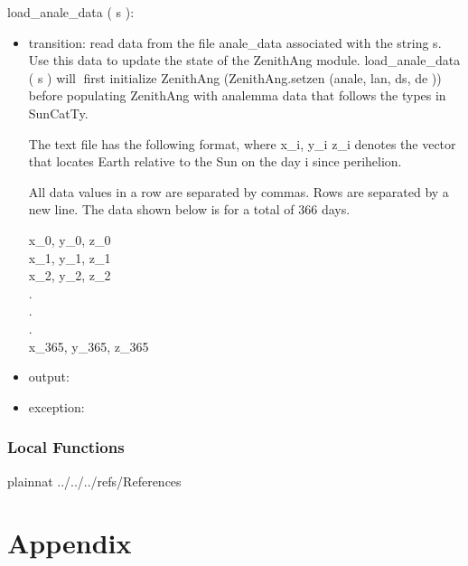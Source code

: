 \documentclass[12pt, titlepage]{article}
\begin{document}
\noindent  load\_anale\_data ( s ):
\begin{itemize}
\item transition: read data from the file anale\_data associated with the string s. Use
this data to update the state of the ZenithAng module. load\_anale\_data ( s ) will first initialize ZenithAng (ZenithAng.setzen (anale, lan, ds, de )) before populating ZenithAng with analemma data that follows the types in SunCatTy.

The text file has the following format, where x\_i, y\_i z\_i denotes the vector that locates
Earth relative to the Sun on the day i since perihelion.

All data values in a row are separated by commas. Rows are separated by a new line. The data shown below is for a total of 366 days.
\begin{center}
x\_0,   y\_0,   z\_0\\
x\_1,   y\_1,   z\_1\\
x\_2,   y\_2,   z\_2\\
.\\
.\\
.\\
x\_365,   y\_365,   z\_365\\
\end{center}
\item output: 
\item exception: 
\end{itemize}
 

\subsubsection{Local Functions}


\newpage

 {plainnat}
 {../../../refs/References}

\newpage

\section{Appendix} \label{Appendix}

\end{document}
